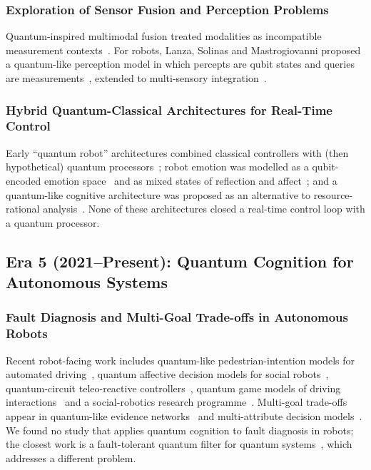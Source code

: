 \documentclass[pdflatex,sn-basic]{sn-jnl}
\begin{document}
\subsubsection{Exploration of Sensor Fusion and Perception Problems}
Quantum-inspired multimodal fusion treated modalities as incompatible measurement contexts~\citep{Li2021a,Gkoumas2021}. For robots, Lanza, Solinas and Mastrogiovanni proposed a quantum-like perception model in which percepts are qubit states and queries are measurements~\citep{Lanza2020}, extended to multi-sensory integration~\citep{Lanza2021}.

\subsubsection{Hybrid Quantum-Classical Architectures for Real-Time Control}
Early ``quantum robot'' architectures combined classical controllers with (then hypothetical) quantum processors~\citep{Benioff1998,Dong2006}; robot emotion was modelled as a qubit-encoded emotion space~\citep{Yan2019} and as mixed states of reflection and affect~\citep{Hoorn2019}; and a quantum-like cognitive architecture was proposed as an alternative to resource-rational analysis~\citep{Moreira2020a}. None of these architectures closed a real-time control loop with a quantum processor.

\subsection{Era 5 (2021--Present): Quantum Cognition for Autonomous Systems}\label{sec:era5}

\subsubsection{Fault Diagnosis and Multi-Goal Trade-offs in Autonomous Robots}
Recent robot-facing work includes quantum-like pedestrian-intention models for automated driving~\citep{Song2022}, quantum affective decision models for social robots~\citep{Ho2022,Yan2021c}, quantum-circuit teleo-reactive controllers~\citep{Chella2026}, quantum game models of driving interactions~\citep{Essalmi2025,Essalmi2026} and a social-robotics research programme~\citep{DeCarolis2025}. Multi-goal trade-offs appear in quantum-like evidence networks~\citep{Gao2025} and multi-attribute decision models~\citep{She2021}. We found no study that applies quantum cognition to fault diagnosis in robots; the closest work is a fault-tolerant quantum filter for quantum systems~\citep{Gao2021}, which addresses a different problem.
\end{document}
